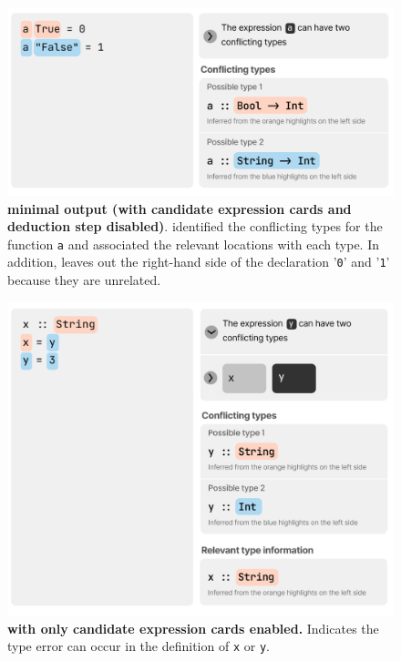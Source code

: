 \begin{figure}
    \centering
    \includegraphics[width=\linewidth, trim=0mm 10mm 0mm 0mm]{images/intro-compare.pdf}
    \caption{
        \textbf{\chameleon{} minimal output (with candidate expression cards and deduction step disabled)}. \chameleon{} identified the conflicting types for the function \texttt{a} and associated the relevant locations with each type. In addition, \chameleon{} leaves out the right-hand side of the declaration '\texttt{0}' and '\texttt{1}' because they are unrelated.
}
    \label{fig:compare}
\end{figure}

\begin{figure}
    \centering
    \includegraphics[width=\linewidth, trim=0mm 10mm 0mm 0mm]{images/intro-candidate.pdf}
    \caption{
        \textbf{\chameleon{} with only candidate expression cards enabled.}
        Indicates the type error can
        occur in the definition of \texttt{x} or \texttt{y}.
    }
    \label{fig:expression}
\end{figure}


